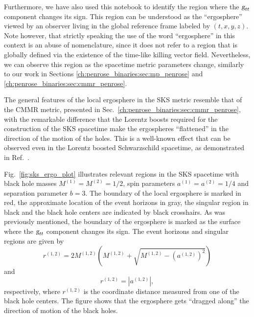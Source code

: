 Furthermore, we have also used this notebook to identify the region where the $\mtrtens{t}{t}$ component changes its sign. This region can be understood as the ``ergosphere'' viewed by an observer living in the global reference frame labeled by $(t,x,y,z)$. Note however, that strictly speaking the use of the word ``ergosphere'' in this context is an abuse of nomenclature, since it does not refer to a region that is globally defined via the existence of the time-like killing vector field. Nevertheless, we can observe this region as the spacetime metric parameters change, similarly to our work in Sections \ref{ch:penrose_binaries:sec:mp_penrose} and \ref{ch:penrose_binaries:sec:cmmr_penrose}.

The general features of the local ergosphere in the \ac{SKS} metric resemble that of the \ac{CMMR} metric, presented in Sec.~\ref{ch:penrose_binaries:sec:cmmr_penrose}, with the remarkable difference that the Lorentz boosts required for the construction of the \ac{SKS} spacetime make the ergospheres ``flattened'' in the direction of the motion of the holes. This is a well-known effect that can be observed even in the Lorentz boosted Schwarzschild spacetime, as demonstrated in Ref.~\cite{PhysRevD.91.084044}.

Fig.~\ref{fig:sks_ergo_plot} illustrates relevant regions in the \ac{SKS} spacetime with black hole masses $M^{(1)} = M^{(2)} = 1/2$, spin parameters $a^{(1)} = a^{(2)} = 1/4$ and separation parameter $b = 3$. The boundary of the local ergosphere is marked in red, the approximate location of the event horizons in gray, the singular region in black and the black hole centers are indicated by black crosshairs. As was previously mentioned, the boundary of the ergosphere is marked as the surface where the $\mtrtens{t}{t}$ component changes its sign. The event horizons and singular regions are given by~\cite{Armengol:2021shd}
%
\begin{equation}
  r^{(1,2)} = 2 M^{(1,2)} \left( M^{(1,2)} + \sqrt{M^{(1,2)} - \left(a^{(1,2)}\right)^2} \right)
  \label{eq:arbitrary_penrose_sks_keplerian_approx_horizons}
\end{equation}
%
and
%
\begin{equation}
  r^{(1,2)} = \left| a^{(1,2)} \right|,
  \label{eq:arbitrary_penrose_sks_keplerian_approx_singularities}
\end{equation}
%
respectively, where $r^{(1,2)}$ is the coordinate distance measured from one of the black hole centers. The figure shows that the ergosphere gets ``dragged along'' the direction of motion of the black holes.

